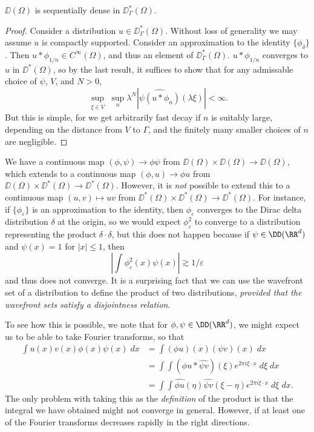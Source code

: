 \begin{theorem}
    $\DD(\Omega)$ is sequentially dense in $\DD^*_\Gamma(\Omega)$.
\end{theorem}
\begin{proof}
    Consider a distribution $u \in \DD^*_\Gamma(\Omega)$. Without loss of generality we may assume $u$ is compactly supported. Consider an approximation to the identity $\{ \phi_\delta \}$. Then $u * \phi_{1/n} \in C^\infty(\Omega)$, and thus an element of $\DD^*_\Gamma(\Omega)$. $u * \phi_{1/n}$ converges to $u$ in $\DD^*(\Omega)$, so by the last result, it suffices to show that for any admissable choice of $\psi$, $V$, and $N > 0$,
    \[ \sup_{\substack{\xi \in V}} \sup_n \lambda^N |\widehat{\psi (u * \phi_n)}(\lambda \xi)| < \infty. \]
    But this is simple, for we get arbitrarily fast decay if $n$ is suitably large, depending on the distance from $V$ to $\Gamma$, and the finitely many smaller choices of $n$ are negligible.
\end{proof}

We have a continuous map $(\phi,\psi) \to \phi \psi$ from $\DD(\Omega) \times \DD(\Omega) \to \DD(\Omega)$, which extends to a continuous map $(\phi,u) \to \phi u$ from $\DD(\Omega) \times \DD^*(\Omega) \to \DD^*(\Omega)$. However, it is \emph{not} possible to extend this to a continuous map $(u,v) \mapsto uv$ from $\DD^*(\Omega) \times \DD^*(\Omega) \to \DD^*(\Omega)$. For instance, if $\{ \phi_\varepsilon \}$ is an approximation to the identity, then $\phi_\varepsilon$ converges to the Dirac delta distribution $\delta$ at the origin, so we would expect $\phi_\varepsilon^2$ to converge to a distribution representing the product $\delta \cdot \delta$, but this does not happen because if $\psi \in \DD(\RR^d)$ and $\psi(x) = 1$ for $|x| \leq 1$, then
%
\[ \left| \int \phi_\varepsilon^2(x) \psi(x) \right| \gtrsim 1/\varepsilon \]
%
and thus does not converge. It is a surprising fact that we can use the wavefront set of a distribution to define the product of two distributions, \emph{provided that the wavefront sets satisfy a disjointness relation}.

To see how this is possible, we note that for $\phi,\psi \in \DD(\RR^d)$, we might expect us to be able to take Fourier transforms, so that
%
\begin{align*}
    \int u(x) v(x) \phi(x) \psi(x)\; dx &= \int (\phi u)(x) (\psi v)(x)\; dx\\
    &= \int \int (\widehat{\phi u} * \widehat{\psi v})(\xi) e^{2 \pi i \xi \cdot x}\; d\xi\; dx\\
    &= \int \int \widehat{\phi u}(\eta) \widehat{\psi v}(\xi - \eta) e^{2 \pi i \xi \cdot x}\; d\xi\; dx.
\end{align*}
%
The only problem with taking this as the \emph{definition} of the product is that the integral we have obtained might not converge in general. However, if at least one of the Fourier transforms decreases rapidly in the right directions.

